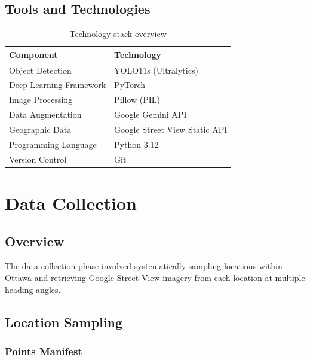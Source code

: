\documentclass[12pt,a4paper]{article}
\begin{document}
\subsection{Tools and Technologies}

\begin{table}[H]
	\centering
	\begin{tabular}{ll}
		\toprule
		\textbf{Component}      & \textbf{Technology}           \\
		\midrule
		Object Detection        & YOLO11s (Ultralytics)         \\
		Deep Learning Framework & PyTorch                       \\
		Image Processing        & Pillow (PIL)                  \\
		Data Augmentation       & Google Gemini API             \\
		Geographic Data         & Google Street View Static API \\
		Programming Language    & Python 3.12                   \\
		Version Control         & Git                           \\
		\bottomrule
	\end{tabular}
	\caption{Technology stack overview}
\end{table}

\section{Data Collection}

\subsection{Overview}

The data collection phase involved systematically sampling locations within Ottawa and retrieving Google Street View imagery from each location at multiple heading angles.

\subsection{Location Sampling}

\subsubsection{Points Manifest}
\end{document}
